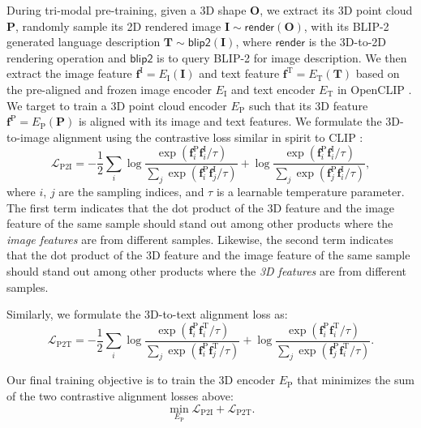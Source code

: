 \documentclass[10pt,twocolumn,letterpaper]{article}
\begin{document}
During tri-modal pre-training, given a 3D shape $\mathbf{O}$, we extract its 3D point cloud $\mathbf{P}$, randomly sample its 2D rendered image $\mathbf{I}\sim\mathsf{render}(\mathbf{O})$, with its BLIP-2 generated language description $\mathbf{T}\sim\mathsf{blip2}(\mathbf{I})$, where $\mathsf{render}$ is the 3D-to-2D rendering operation and $\mathsf{blip2}$ is to query BLIP-2 \cite{li2023blip} for image description. We then extract the image feature $\mathbf{f}^\text{I}=E_\text{I}(\mathbf{I})$ and text feature $\mathbf{f}^\text{T}=E_\text{T}(\mathbf{T})$ based on the pre-aligned and frozen image encoder $E_\text{I}$ and text encoder $E_\text{T}$ in OpenCLIP \cite{ilharco_gabriel_2021_5143773}. We target to train a 3D point cloud encoder $E_\text{P}$ such that its 3D feature $\mathbf{f}^\text{P}=E_\text{P}(\mathbf{P})$ is aligned with its image and text features. We formulate the 3D-to-image alignment using the contrastive loss similar in spirit to CLIP \cite{radford2021learning}:
\begin{equation}
\mathcal{L}_\text{P2I}=-\frac{1}{2}\sum_i\log\frac{\exp(\mathbf{f}_i^\text{P} \mathbf{f}_i^\text{I}/\tau)}{\sum_j\exp(\mathbf{f}_i^\text{P} \mathbf{f}_j^\text{I}/\tau)}+\log\frac{\exp(\mathbf{f}_i^\text{P} \mathbf{f}_i^\text{I}/\tau)}{\sum_j\exp(\mathbf{f}_j^\text{P} \mathbf{f}_i^\text{I}/\tau)},
\end{equation}
where $i$, $j$ are the sampling indices, and $\tau$ is a learnable temperature parameter. The first term indicates that the dot product of the 3D feature and the image feature of the same sample should stand out among other products where the \textit{image features} are from different samples. Likewise, the second term indicates that the dot product of the 3D feature and the image feature of the same sample should stand out among other products where the \textit{3D features} are from different samples.

Similarly, we formulate the 3D-to-text alignment loss as:
\begin{equation}
\mathcal{L}_\text{P2T}=-\frac{1}{2}\sum_i\log\frac{\exp(\mathbf{f}_i^\text{P} \mathbf{f}_i^\text{T}/\tau)}{\sum_j\exp(\mathbf{f}_i^\text{P} \mathbf{f}_j^\text{T}/\tau)}+\log\frac{\exp(\mathbf{f}_i^\text{P} \mathbf{f}_i^\text{T}/\tau)}{\sum_j\exp(\mathbf{f}_j^\text{P} \mathbf{f}_i^\text{T}/\tau)}.
\end{equation}

Our final training objective is to train the 3D encoder $E_\text{P}$ that minimizes the sum of the two contrastive alignment losses above:
\vspace{-2mm}
\begin{equation}
\min_{E_\text{P}}\mathcal{L}_\text{P2I}+\mathcal{L}_\text{P2T}.
\end{equation}
\vspace{-6mm}
\end{document}
